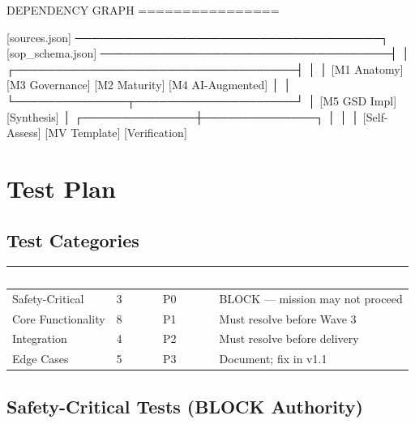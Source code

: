 \documentclass[11pt,letterpaper]{article}
\newcommand{\tableheader}[1]{\textbf{\sffamily\textcolor{white}{#1}}}
\begin{document}
\begin{asciibox}
  DEPENDENCY GRAPH
  ================

  [sources.json] ──────────────────────────────────────┐
  [sop_schema.json] ────────────────────────────────────┤
                                                        │
                    ┌───────────────────────────────────┤
                    │                                   │
             [M1 Anatomy]                    [M3 Governance]
             [M2 Maturity]                  [M4 AI-Augmented]
                    │                                   │
                    └──────────────┬────────────────────┘
                                   │
                           [M5 GSD Impl]
                           [Synthesis]
                                   │
                    ┌──────────────┼──────────────┐
                    │              │              │
              [Self-Assess]  [MV Template]  [Verification]
\end{asciibox}

\section{Test Plan}

\subsection{Test Categories}

\begin{center}
\begin{tabularx}{\textwidth}{L{3.5cm}L{1.5cm}L{2cm}X}
\toprule
{}
\tableheader{Category} & \tableheader{Count} & \tableheader{Priority} & \tableheader{Failure Action} \\
\midrule
Safety-Critical & 3 & P0 & BLOCK — mission may not proceed \\
Core Functionality & 8 & P1 & Must resolve before Wave 3 \\
Integration & 4 & P2 & Must resolve before delivery \\
Edge Cases & 5 & P3 & Document; fix in v1.1 \\
\bottomrule
\end{tabularx}
\end{center}

\subsection{Safety-Critical Tests (BLOCK Authority)}
\end{document}
